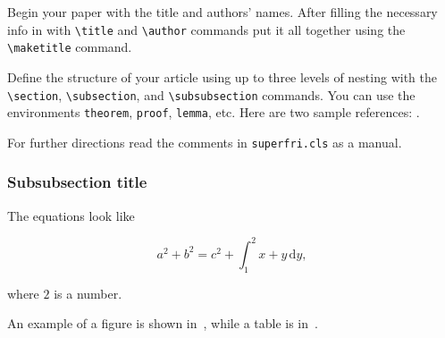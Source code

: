 \documentclass{superfri}
\begin{document}
Begin your paper with the title and authors' names. After filling the
necessary info in with \verb=\title= and \verb=\author= commands put it all
together using the \verb=\maketitle= command.

Define the structure of your article using up to three levels of nesting with
the \verb=\section=, \verb=\subsection=, and \verb=\subsubsection= commands.
You can use the environments \verb=theorem=, \verb=proof=, \verb=lemma=, etc.
Here are two sample references:
\cite{Cadez:2000:VNP:347090.347151,Stonebraker:1994:PND:190956.191247}.

For further directions read the comments in \verb=superfri.cls= as a manual.

\subsubsection{Subsubsection title}

The equations look like

\begin{equation}
a^2 + b^2 = c^2 + \int_1^2 x+y \, \mathrm{d}y,
\end{equation}

where $2$ is a number.

An example of a figure is shown in~, while a table
is in~.






\end{document}

